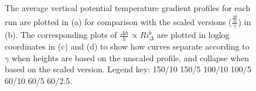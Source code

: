 

\begin{figure}[htbp]
\begin{minipage}[b]{0.5\linewidth}
        \\
        \\
                     
\end{minipage}             
\quad
\begin{minipage}[b]{0.5\linewidth}
        \\      
        \\      
       
        \end{minipage}
        \caption{The average vertical potential temperature gradient profiles for each run are plotted in (a) for comparison with the scaled versions ($\frac{\frac{\partial \overline{\theta}}{\partial z}}{\gamma}$) in (b).  The corresponding plots of $\frac{\Delta h}{h} \propto Ri_{\Delta} ^{b}$ are plotted in loglog coordinates in (c) and (d) to show how curves separate according to $\gamma$ when heights are based on the unscaled profile, and collapse when based on the scaled version.  Legend key:{\color{red} } 150/10  150/5 \hspace{2mm} {\color{black} } 100/10 \hspace{2mm} {\color{black} } 100/5 \hspace{2mm} {\color{offyellow} } 60/10 \hspace{2mm} {\color{offyellow} } 60/5 \hspace{2mm} {\color{offyellow} } 60/2.5.}
        \label{fig:scaleddeltahinvri}
\end{figure}


